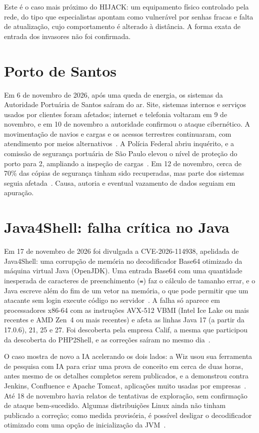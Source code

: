 \documentclass[12pt,openright,oneside,a4paper,english,brazil]{abntex2}
\begin{document}
Este é o caso mais próximo do HIJACK: um equipamento físico controlado pela rede, do tipo que especialistas apontam como vulnerável por senhas fracas e falta de atualização, cujo comportamento é alterado à distância. A forma exata de entrada dos invasores não foi confirmada.

\section{Porto de Santos}

Em 6 de novembro de 2026, após uma queda de energia, os sistemas da Autoridade Portuária de Santos saíram do ar. Site, sistemas internos e serviços usados por clientes foram afetados; internet e telefonia voltaram em 9 de novembro, e em 10 de novembro a autoridade confirmou o ataque cibernético. A movimentação de navios e cargas e os acessos terrestres continuaram, com atendimento por meios alternativos~\cite{sbt-santos,carta-santos}. A Polícia Federal abriu inquérito, e a comissão de segurança portuária de São Paulo elevou o nível de proteção do porto para 2, ampliando a inspeção de cargas~\cite{carta-santos}. Em 12 de novembro, cerca de 70\% das cópias de segurança tinham sido recuperadas, mas parte dos sistemas seguia afetada~\cite{times-santos}. Causa, autoria e eventual vazamento de dados seguiam em apuração.

\section{Java4Shell: falha crítica no Java}

Em 17 de novembro de 2026 foi divulgada a CVE-2026-114938, apelidada de Java4Shell: uma corrupção de memória no decodificador Base64 otimizado da máquina virtual Java (OpenJDK). Uma entrada Base64 com uma quantidade inesperada de caracteres de preenchimento (\texttt{=}) faz o cálculo de tamanho errar, e o Java escreve além do fim de um vetor na memória, o que pode permitir que um atacante sem login execute código no servidor~\cite{wiz-java4shell}. A falha só aparece em processadores x86-64 com as instruções AVX-512 VBMI (Intel Ice Lake ou mais recentes e AMD Zen~4 ou mais recentes) e afeta as linhas Java 17 (a partir da 17.0.6), 21, 25 e 27. Foi descoberta pela empresa Calif, a mesma que participou da descoberta do PHP2Shell, e as correções saíram no mesmo dia~\cite{tenable-java4shell}.

O caso mostra de novo a IA acelerando os dois lados: a Wiz usou sua ferramenta de pesquisa com IA para criar uma prova de conceito em cerca de duas horas, antes mesmo de os detalhes completos serem publicados, e a demonstrou contra Jenkins, Confluence e Apache Tomcat, aplicações muito usadas por empresas~\cite{wiz-java4shell}. Até 18 de novembro havia relatos de tentativas de exploração, sem confirmação de ataque bem-sucedido. Algumas distribuições Linux ainda não tinham publicado a correção; como medida provisória, é possível desligar o decodificador otimizado com uma opção de inicialização da JVM~\cite{tenable-java4shell}.
\end{document}
